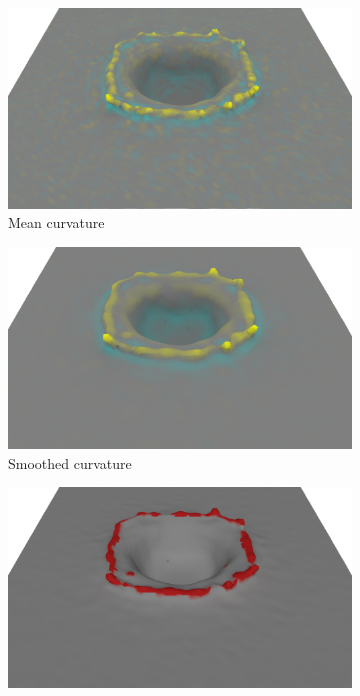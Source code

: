 \begin{figure}[t]
\centering
    \begin{subfigure}[b]{0.45\linewidth}
    \centering
    \includegraphics[width=\textwidth]{images/fluidsculpting-mig2016/nonSmoothedCurvature.eps}
    \caption{\label{fig:nonSmoothedCurvature}Mean curvature}
    \end{subfigure}
    \hspace{0.1cm}
    \begin{subfigure}[b]{0.45\linewidth}
    \centering
    \includegraphics[width=\textwidth]{images/fluidsculpting-mig2016/smoothedCurvature.eps}
    \caption{\label{fig:smoothedCurvature}Smoothed curvature}
    \end{subfigure}
    \begin{subfigure}[b]{0.45\linewidth}
    \centering
    \includegraphics[width=\textwidth]{images/fluidsculpting-mig2016/curvatureThreshold.eps}

\end{subfigure}
\end{figure}
